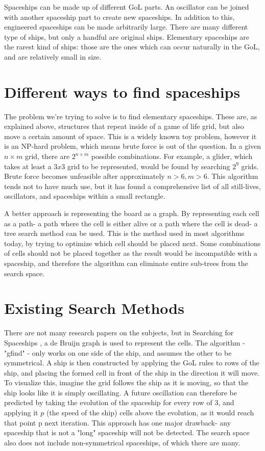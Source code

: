 \documentclass{l4proj}
\begin{document}
Spaceships can be made up of different GoL parts. An oscillator can be joined with another spaceship part to create new spaceships. In addition to this, engineered spaceships can be made arbitrarily large. There are many different type of ships, but only a handful are original ships. Elementary spaceships are the rarest kind of ships: those are the ones which can occur naturally in the GoL, and are relatively small in size.


\section{Different ways to find spaceships}

The problem we're trying to solve is to find elementary spaceships. These are, as explained above, structures that repeat inside of a game of life grid, but also move a certain amount of space. This is a widely known toy problem, however it is an NP-hard problem, which means brute force is out of the question. In a given $n \times m$ grid, there are $2^{n \times m}$ possible combinations. For example, a glider, which takes at least a $3x3$ grid to be represented, would be found by searching $2^{9}$ grids. Brute force becomes unfeasible after approximately $n > 6, m > 6$. This algorithm tends not to have much use, but it has found a comprehensive list of all still-lives, oscillators, and spaceships within a small rectangle.

A better approach is representing the board as a graph. By representing each cell as a path- a path where the cell is either alive or a path where the cell is dead- a tree search method can be used. This is the method used in most algorithms today, by trying to optimize which cell should be placed next. Some combinations of cells should not be placed together as the result would be incompatible with a spaceship, and therefore the algorithm can eliminate entire sub-trees from the search space.

\section{Existing Search Methods}

There are not many research papers on the subjects, but in Searching for Spaceships \cite{searching_for_spaceships}, a de Bruijn graph is used to represent the cells. The algorithm - "gfind" - only works on one side of the ship, and assumes the other to be symmetrical. A ship is then constructed by applying the GoL rules to rows of the ship, and placing the formed cell in front of the ship in the direction it will move. To visualize this, imagine the grid follows the ship as it is moving, so that the ship looks like it is simply oscillating. A future oscillation can therefore be predicted by taking the evolution of the spaceship for every row of 3, and applying it $p$ (the speed of the ship) cells above the evolution, as it would reach that point p next iteration. This approach has one major drawback- any spaceship that is not a "long" spaceship will not be detected. The search space also does not include non-symmetrical spaceships, of which there are many.
\end{document}
